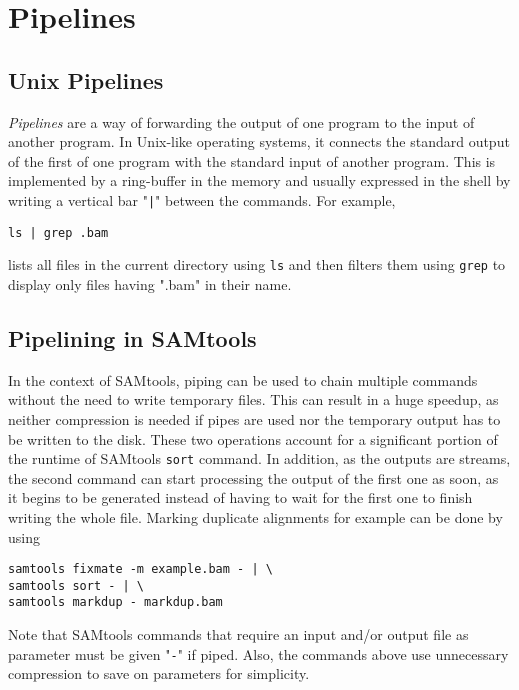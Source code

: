 \section{Pipelines}

\subsection{Unix Pipelines}

\textit{Pipelines} are a way of forwarding the output of one program to the input of another program. In Unix-like operating systems, it connects the standard output of the first of one program with the standard input of another program. This is implemented by a ring-buffer in the memory and usually expressed in the shell by writing a vertical bar "\texttt{|}" between the commands. For example, 
\begin{verbatim} 
ls | grep .bam 
\end{verbatim}
lists all files in the current directory using \texttt{ls} and then filters them using \texttt{grep} to display only files having ".bam" in their name. 

\subsection{Pipelining in SAMtools}
In the context of SAMtools, piping can be used to chain multiple commands without the need to write temporary files. This can result in a huge speedup, as neither compression is needed if pipes are used nor the temporary output has to be written to the disk. These two operations account for a significant portion of the runtime of SAMtools \texttt{sort} command. In addition, as the outputs are streams, the second command can start processing the output of the first one as soon, as it begins to be generated instead of having to wait for the first one to finish writing the whole file.
Marking duplicate alignments for example can be done by using 
\begin{verbatim} 
samtools fixmate -m example.bam - | \
samtools sort - | \ 
samtools markdup - markdup.bam
\end{verbatim}
Note that SAMtools commands that require an input and/or output file as parameter must be given "\texttt{-}" if piped. Also, the commands above use unnecessary compression to save on parameters for simplicity. \\

